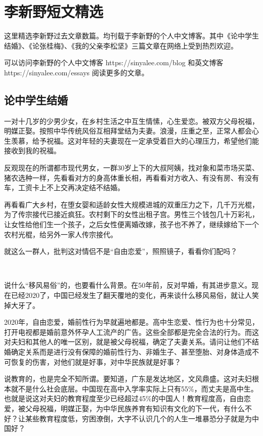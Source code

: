 \chapter{李新野短文精选}

这里精选李新野过去文章数篇。均刊载于李新野的个人中文博客。其中《论中学生结婚》、《论张桂梅》、《我的父亲李松坚》三篇文章在网络上受到热烈欢迎。

可以访问李新野的个人中文博客 https://sinyalee.com/blog 和英文博客 https://sinyalee.com/essays 阅读更多的文章。

\newpage

\section{论中学生结婚}

一对十几岁的少男少女，在乡村生活之中互生情愫，心生爱恋。被双方父母祝福，明媒正娶。按照中华传统风俗互相拜堂结为夫妻。浪漫，庄重之至，正常人都会心生羡慕，给予祝福。这对年轻的夫妻现在一定承受着巨大的心理压力，希望他们能接收到我的祝福。

反观现在的所谓都市现代男女，一群30岁上下的大叔阿姨，找对象和菜市场买菜、猪农选种一样，先看看对方的身高体重长相，再看看对方收入、有没有房、有没有车，工资卡上不上交再决定结不结婚。

再看看广大乡村，在堕女婴和适龄女性大规模进城的双重压力之下，几千万光棍，为了传宗接代已接近疯狂。农村剩下的女性出租子宫。男性三个钱包几十万彩礼，让女性给他们生一个孩子，之后女性便离婚改嫁，孩子也不养了，继续嫁给下一个农村光棍，给另外一家人传宗接代。

就这么一群人，批判这对情侣不是``自由恋爱''，照照镜子，看看你们配吗？

\ 

说什么``移风易俗''的，也要看什么背景。在50年前，反对早婚，有其进步意义。现在已经2020了，中国已经发生了翻天覆地的变化，再来谈什么移风易俗，就让人笑掉大牙了。

2020年，自由恋爱，婚前性行为早就遍地都是。高中生恋爱、性行为也十分常见，打开电视都是婚前意外怀孕人工流产的广告。这些全部都是完全合法的行为。而这对夫妇和其他人的唯一区别，就是被父母祝福，确定了夫妻关系。请问让他们不结婚确定关系而是进行没有保障的婚前性行为、非婚生子、甚至堕胎、对身体造成不可恢复的伤害，对他们就是好事，对中华民族就是好事？

说教育的，也是完全不知所谓。要知道，广东是发达地区，文风鼎盛。这对夫妇根本就不是什么社会底层。中国现在高中入学率实际上只有55\%，而丈夫是高中生。也就是说这对夫妇的教育程度至少已经超过45\%的中国人！教育程度高，自由恋爱，被父母祝福，明媒正娶，为中华民族养育有知识有文化的下一代，有什么不好？让某些教育程度低，穷困潦倒，大字不认识几个的人生一堆暴恐分子就是为中国好？

